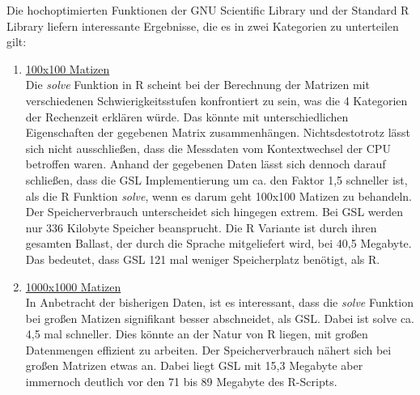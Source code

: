 Die hochoptimierten Funktionen der GNU Scientific Library und der  Standard R Library liefern interessante Ergebnisse, die es in zwei Kategorien zu unterteilen gilt:
\begin{enumerate}
	\item \underline{100x100 Matizen}\\
	Die \emph{solve} Funktion in R scheint bei der Berechnung der Matrizen mit verschiedenen Schwierigkeitsstufen konfrontiert zu sein, was die 4 Kategorien der Rechenzeit erklären würde. Das könnte mit unterschiedlichen Eigenschaften der gegebenen Matrix zusammenhängen. Nichtsdestotrotz lässt sich nicht ausschließen, dass die Messdaten vom Kontextwechsel der CPU betroffen waren.
	Anhand der gegebenen Daten lässt sich dennoch darauf schließen, dass die GSL Implementierung um ca. den Faktor 1,5 schneller ist, als die R Funktion \emph{solve}, wenn es darum geht 100x100 Matizen zu behandeln.
	Der Speicherverbrauch unterscheidet sich hingegen extrem. Bei GSL werden nur 336 Kilobyte Speicher beansprucht. Die R Variante ist durch ihren gesamten Bal­last, der durch die Sprache mitgeliefert wird, bei 40,5 Megabyte. Das bedeutet, dass GSL 121 mal weniger Speicherplatz benötigt, als R. 
	\item \underline{1000x1000 Matizen}\\
	In Anbetracht der bisherigen Daten, ist es interessant, dass die \emph{solve} Funktion bei großen Matizen signifikant besser abschneidet, als GSL. Dabei ist solve ca. 4,5 mal schneller. Dies könnte an der Natur von R liegen, mit großen Datenmengen effizient zu arbeiten. Der Speicherverbrauch nähert sich bei großen Matrizen etwas an. Dabei liegt GSL mit 15,3 Megabyte aber immernoch deutlich vor den 71 bis 89 Megabyte des R-Scripts.
\end{enumerate}









